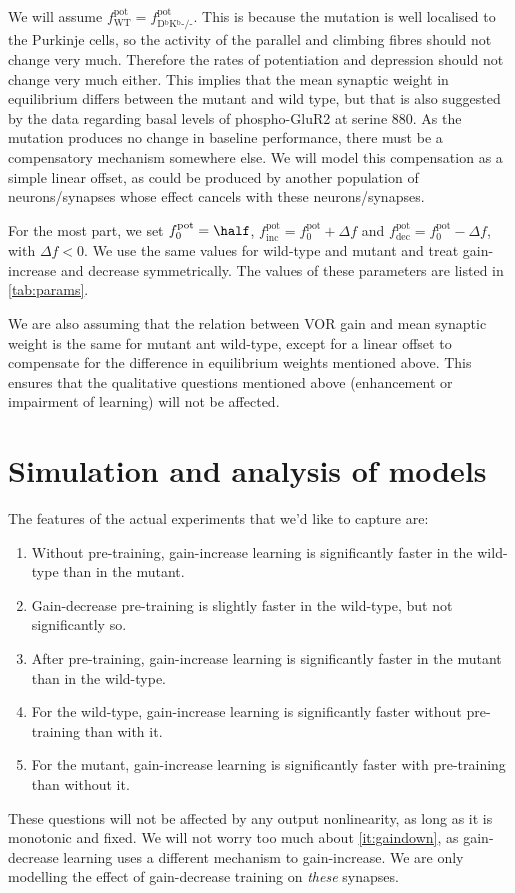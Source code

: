 \documentclass[12pt]{article}
\newcommand{\pot}{^{\text{pot}}}
\newcommand{\norm}{_0}
\newcommand{\inc}{_{\text{inc}}}
\newcommand{\dec}{_{\text{dec}}}
\newcommand{\wt}{_{\text{WT}}}
\newcommand{\ko}{_{\text{D$^\mathrm{b}$K$^\mathrm{b}$-/-}}}
\begin{document}
We will assume $f\pot\wt=f\pot\ko$.
This is because the mutation is well localised to the Purkinje cells, so the activity of the parallel and climbing fibres should not change very much.
Therefore the rates of potentiation and depression should not change very much either.
This implies that the mean synaptic weight in equilibrium differs between the mutant and wild type, but that is also suggested by the data regarding basal levels of phospho-GluR2 at serine 880.
As the mutation produces no change in baseline performance, there must be a compensatory mechanism somewhere else.
We will model this compensation as a simple linear offset, as could be produced by another population of neurons/synapses whose effect cancels with these neurons/synapses.

For the most part, we set $f\pot\norm=\half$, $f\pot\inc=f\pot\norm+\Delta f$ and $f\pot\dec=f\pot\norm-\Delta f$, with $\Delta f<0$.
We use the same values for wild-type and mutant and treat gain-increase and decrease symmetrically.
The values of these parameters are listed in \autoref{tab:params}.

We are also assuming that the relation between VOR gain and mean synaptic weight is the same for mutant ant wild-type, except for a linear offset to compensate for the difference in equilibrium weights mentioned above.
This ensures that the qualitative questions mentioned above (enhancement or impairment of learning) will not be affected.




\section{Simulation and analysis of models}\label{sec:results}

The features of the actual experiments that we'd like to capture are:
\begin{enumerate}
  \item Without pre-training, gain-increase learning is significantly faster in the wild-type than in the mutant.
  \item Gain-decrease pre-training is slightly faster in the wild-type, but not significantly so.\label{it:gaindown}
  \item After pre-training, gain-increase learning is significantly faster in the mutant than in the wild-type.
  \item For the wild-type, gain-increase learning is significantly faster without pre-training than with it.
  \item For the mutant, gain-increase learning is significantly faster with pre-training than without it.
\end{enumerate}
These questions will not be affected by any output nonlinearity, as long as it is monotonic and fixed.
We will not worry too much about \autoref{it:gaindown}, as gain-decrease learning uses a different mechanism to gain-increase.
We are only modelling the effect of gain-decrease training on \emph{these} synapses.
\end{document}
